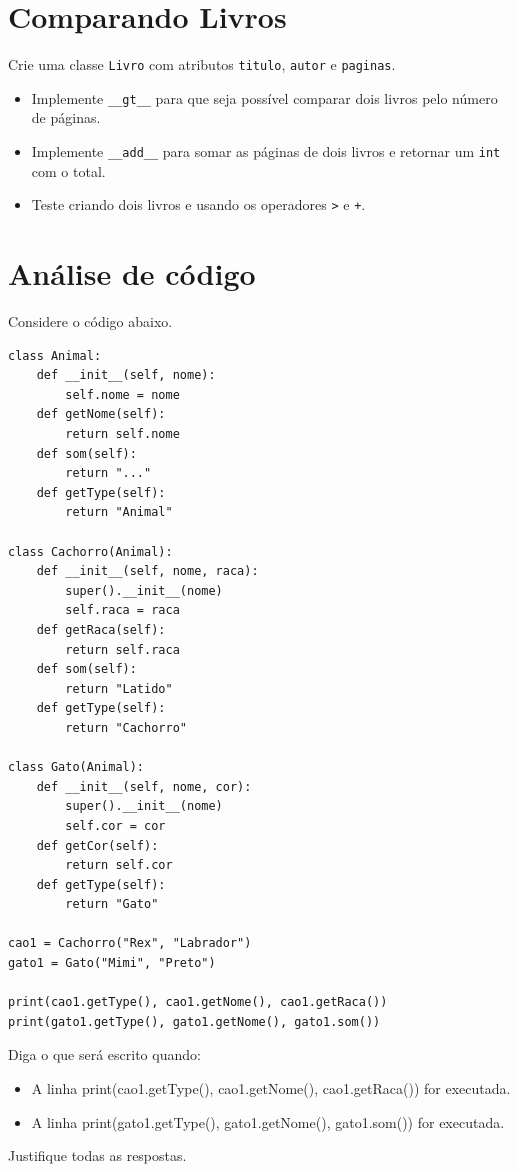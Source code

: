 \section{Comparando Livros}
Crie uma classe \texttt{Livro} com atributos \texttt{titulo}, \texttt{autor} e \texttt{paginas}.
\begin{itemize}
    \item Implemente \texttt{\_\_gt\_\_} para que seja possível comparar dois livros pelo número de páginas.
    \item Implemente \texttt{\_\_add\_\_} para somar as páginas de dois livros e retornar um \texttt{int} com o total.
    \item Teste criando dois livros e usando os operadores \texttt{>} e \texttt{+}.
\end{itemize}


\section{Análise de código}

Considere o código abaixo.

\begin{verbatim}
class Animal:
    def __init__(self, nome):
        self.nome = nome
    def getNome(self):
        return self.nome
    def som(self):
        return "..."
    def getType(self):
        return "Animal"

class Cachorro(Animal):
    def __init__(self, nome, raca):
        super().__init__(nome)
        self.raca = raca
    def getRaca(self):
        return self.raca
    def som(self):
        return "Latido"
    def getType(self):
        return "Cachorro"

class Gato(Animal):
    def __init__(self, nome, cor):
        super().__init__(nome)
        self.cor = cor
    def getCor(self):
        return self.cor
    def getType(self):
        return "Gato"

cao1 = Cachorro("Rex", "Labrador")
gato1 = Gato("Mimi", "Preto")

print(cao1.getType(), cao1.getNome(), cao1.getRaca())
print(gato1.getType(), gato1.getNome(), gato1.som())
\end{verbatim}


Diga o que será escrito quando:

\begin{itemize}

    \item A linha print(cao1.getType(), cao1.getNome(), cao1.getRaca()) for executada.

    \item  A linha print(gato1.getType(), gato1.getNome(), gato1.som()) for executada.

\end{itemize}
Justifique todas as respostas.



